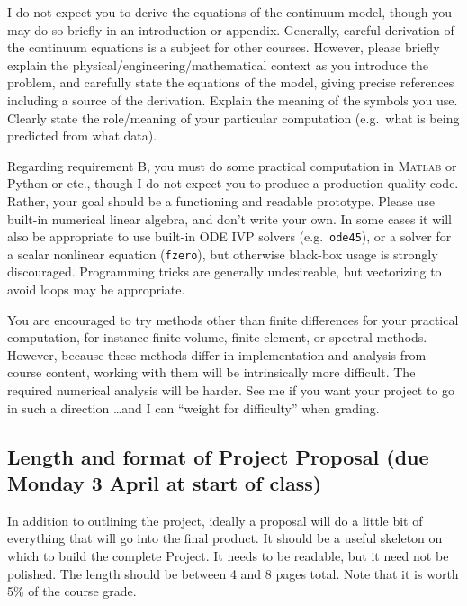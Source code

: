 \documentclass[11pt]{amsart}
\newcommand{\Matlab}{\textsc{Matlab}\xspace}
\begin{document}
I do not expect you to derive the equations of the continuum model, though you may do so briefly in an introduction or appendix.  Generally, careful derivation of the continuum equations is a subject for other courses.  However, please briefly explain the physical/engineering/mathematical context as you introduce the problem, and carefully state the equations of the model, giving precise references including a source of the derivation.  Explain the meaning of the symbols you use.  Clearly state the role/meaning of your particular computation (e.g.~what is being predicted from what data).

Regarding requirement B, you must do some practical computation in \Matlab or Python or etc., though I do not expect you to produce a production-quality code.  Rather, your goal should be a functioning and readable prototype.  Please use built-in numerical linear algebra, and don't write your own.  In some cases it will also be appropriate to use built-in ODE IVP solvers (e.g.~\texttt{ode45}), or a solver for a scalar nonlinear equation (\texttt{fzero}), but otherwise black-box usage is strongly discouraged.  Programming tricks are generally undesireable, but vectorizing to avoid loops may be appropriate.

You are encouraged to try methods other than finite differences for your practical computation, for instance finite volume, finite element, or spectral methods.  However, because these methods differ in implementation and analysis from course content, working with them will be intrinsically more difficult.  The required numerical analysis will be harder.  See me if you want your project to go in such a direction \dots and I can ``weight for difficulty'' when grading.

\subsection*{Length and format of Project Proposal (due Monday 3 April at start of class)}  In addition to outlining the project, ideally a proposal will do a little bit of everything that will go into the final product.  It should be a useful skeleton on which to build the complete Project.  It needs to be readable, but it need not be polished.  The length should be between 4 and 8 pages total.  Note that it is worth 5\% of the course grade. 
\end{document}
